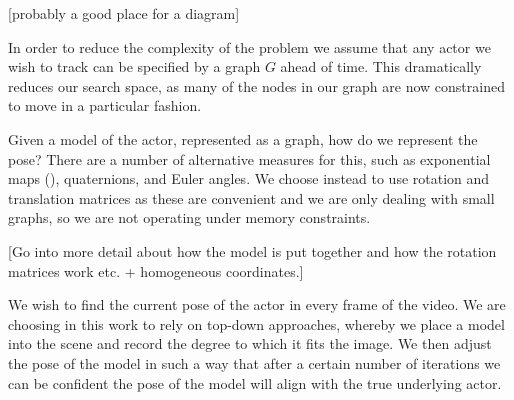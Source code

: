 [probably a good place for a diagram]

In order to reduce the complexity of the problem we assume that any actor we wish to track can be specified by a graph $G$ ahead of time. This dramatically reduces our search space, as many of the nodes in our graph are now constrained to move in a particular fashion. 

Given a model of the actor, represented as a graph, how do we represent the pose? There are a number of alternative measures for this, such as exponential maps (), quaternions, and Euler angles. We choose instead to use rotation and translation matrices as these are convenient and we are only dealing with small graphs, so we are not operating under memory constraints. 

[Go into more detail about how the model is put together and how the rotation matrices work etc. + homogeneous coordinates.]

We wish to find the current pose of the actor in every frame of the video. We are choosing in this work to rely on top-down approaches, whereby we place a model into the scene and record the degree to which it fits the image. We then adjust the pose of the model in such a way that after a certain number of iterations we can be confident the pose of the model will align with the true underlying actor. 

